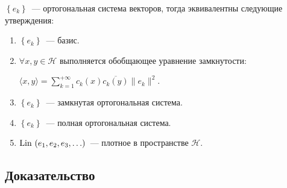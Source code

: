 \documentclass{article}
\begin{document}
        $\left\{ e_k \right\}$~--- ортогональная система векторов, тогда эквивалентны следующие утверждения:
            
        \begin{enumerate}
        
            \item $\left\{ e_k \right\}$~--- базис.
            
            \item $\forall x, y \in \mathcal{H}$ выполняется обобщающее уравнение замкнутости:
            
                $\langle x, y \rangle = \sum\limits_{k = 1}^{+\infty} c_k(x) \overline{c_k(y)} \| e_k \|^2$.
                
            \item $\left\{ e_k \right\}$~--- замкнутая ортогональная система.
            
            \item $\left\{ e_k \right\}$~--- полная ортогональная система.
            
            \item $\Lin(e_1, e_2, e_3, \ldots)$~--- плотное в пространстве $\mathcal{H}$.
            
        \end{enumerate}
        
        \subsection{Доказательство}
        
\end{document}

